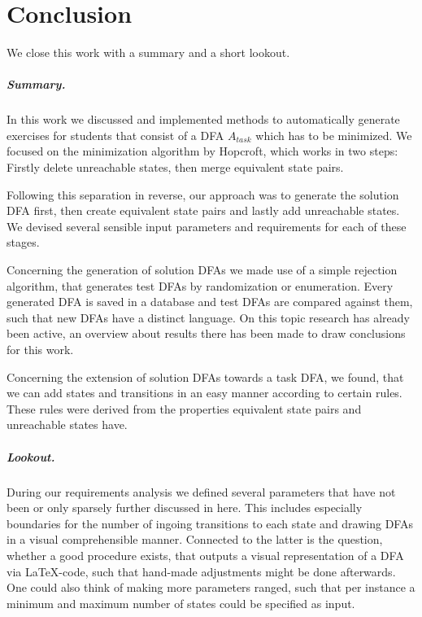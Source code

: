 
\chapter{Conclusion}

We close this work with a summary and a short lookout.

\paragraph*{Summary.}

In this work we discussed and implemented methods to automatically generate exercises for students that consist of a DFA $A_{task}$ which has to be minimized. We focused on the minimization algorithm by Hopcroft, which works in two steps: Firstly delete unreachable states, then merge equivalent state pairs.

Following this separation in reverse, our approach was to generate the solution DFA first, then create equivalent state pairs and lastly add unreachable states. We devised several sensible input parameters and requirements for each of these stages.

Concerning the generation of solution DFAs we made use of a simple rejection algorithm, that generates test DFAs by randomization or enumeration. Every generated DFA is saved in a database and test DFAs are compared against them, such that new DFAs have a distinct language. On this topic research has already been active, an overview about results there has been made to draw conclusions for this work.

Concerning the extension of solution DFAs towards a task DFA, we found, that we can add states and transitions in an easy manner according to certain rules. These rules were derived from the properties equivalent state pairs and unreachable states have.

\paragraph*{Lookout.}

During our requirements analysis we defined several parameters that have not been or only sparsely further discussed in here. This includes especially boundaries for the number of ingoing transitions to each state and drawing DFAs in a visual comprehensible manner. Connected to the latter is the question, whether a good procedure exists, that outputs a visual representation of a DFA via LaTeX-code, such that hand-made adjustments might be done afterwards. One could also think of making more parameters ranged, such that per instance a minimum and maximum number of states could be specified as input.

